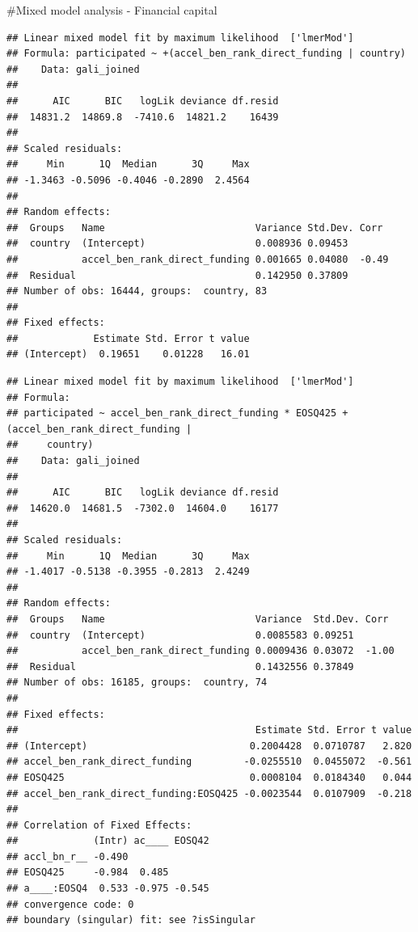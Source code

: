 \documentclass[
  english,
  man]{apa6}
\begin{document}
\#Mixed model analysis - Financial capital

\begin{verbatim}
## Linear mixed model fit by maximum likelihood  ['lmerMod']
## Formula: participated ~ +(accel_ben_rank_direct_funding | country)
##    Data: gali_joined
## 
##      AIC      BIC   logLik deviance df.resid 
##  14831.2  14869.8  -7410.6  14821.2    16439 
## 
## Scaled residuals: 
##     Min      1Q  Median      3Q     Max 
## -1.3463 -0.5096 -0.4046 -0.2890  2.4564 
## 
## Random effects:
##  Groups   Name                          Variance Std.Dev. Corr 
##  country  (Intercept)                   0.008936 0.09453       
##           accel_ben_rank_direct_funding 0.001665 0.04080  -0.49
##  Residual                               0.142950 0.37809       
## Number of obs: 16444, groups:  country, 83
## 
## Fixed effects:
##             Estimate Std. Error t value
## (Intercept)  0.19651    0.01228   16.01
\end{verbatim}

\begin{verbatim}
## Linear mixed model fit by maximum likelihood  ['lmerMod']
## Formula: 
## participated ~ accel_ben_rank_direct_funding * EOSQ425 + (accel_ben_rank_direct_funding |  
##     country)
##    Data: gali_joined
## 
##      AIC      BIC   logLik deviance df.resid 
##  14620.0  14681.5  -7302.0  14604.0    16177 
## 
## Scaled residuals: 
##     Min      1Q  Median      3Q     Max 
## -1.4017 -0.5138 -0.3955 -0.2813  2.4249 
## 
## Random effects:
##  Groups   Name                          Variance  Std.Dev. Corr 
##  country  (Intercept)                   0.0085583 0.09251       
##           accel_ben_rank_direct_funding 0.0009436 0.03072  -1.00
##  Residual                               0.1432556 0.37849       
## Number of obs: 16185, groups:  country, 74
## 
## Fixed effects:
##                                         Estimate Std. Error t value
## (Intercept)                            0.2004428  0.0710787   2.820
## accel_ben_rank_direct_funding         -0.0255510  0.0455072  -0.561
## EOSQ425                                0.0008104  0.0184340   0.044
## accel_ben_rank_direct_funding:EOSQ425 -0.0023544  0.0107909  -0.218
## 
## Correlation of Fixed Effects:
##             (Intr) ac____ EOSQ42
## accl_bn_r__ -0.490              
## EOSQ425     -0.984  0.485       
## a____:EOSQ4  0.533 -0.975 -0.545
## convergence code: 0
## boundary (singular) fit: see ?isSingular
\end{verbatim}
\end{document}
